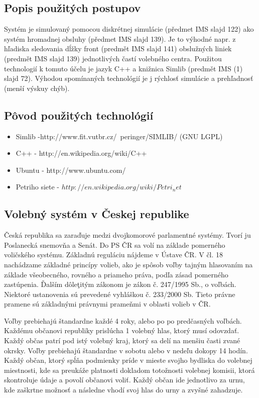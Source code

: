 \documentclass[12pt,a4paper,titlepage,final]{article}
\begin{document}
\subsection{Popis použitých postupov}
Systém je simulovaný pomocou diskrétnej simulácie (předmet IMS slajd 122) ako systém hromadnej obsluhy 
(předmet IMS slajd 139). Je to výhodné napr. z hľadiska sledovania dĺžky front (predmět IMS slajd 141) 
obslužných liniek (predmět IMS slajd 139) jednotlivých častí volebného centra. Použitou 
technologií k tomuto účelu je jazyk C++ a knižnica Simlib (predmět IMS (1) slajd 72). Výhodou spomínaných 
technológií je j rýchlosť simulácie a 
prehľadnosť (menší výskuy chýb).



\subsection{Pôvod použitých technológií}
\begin{itemize}
\item Simlib -http://www.fit.vutbr.cz/~peringer/SIMLIB/ (GNU LGPL)
\item C++ - http://en.wikipedia.org/wiki/C++
\item Ubuntu - http://www.ubuntu.com/
\item Petriho siete - $http://en.wikipedia.org/wiki/Petri_net$

\end{itemize}



\subsection{Volebný systém v Českej republike}
Česká republika sa zaraďuje medzi dvojkomorové parlamentné 
systémy. Tvorí ju Poslanecká snemovňa a Senát. Do PS ČR sa volí na 
základe pomerného voličského systému. Základnú reguláciu nájdeme 
v Ústave ČR. V čl. 18 nachádzame základné princípy volieb, ako je spôsob 
voľby tajným hlasovaním na základe všeobecného, rovného a priameho 
práva, podľa zásad pomerného zastúpenia. Ďalším dôleţitým zákonom je 
zákon č. 247/1995 Sb., o voľbách. Niektoré ustanovenia sú prevedené 
vyhláškou č. 233/2000 Sb. Tieto právne pramene sú základnými právnymi 
prameňmi v oblasti volieb v ČR.\cite{Seda:Voleb}

Voľby prebiehajú štandardne každé 4 roky, alebo po po predčasných voľbách. Každému občanovi republiky prislúcha 1 volebný hlas, ktorý musí odovzdať. Každý občas patrí pod istý volebný kraj, ktorý sa delí na menšiu časti zvané okrsky. Voľby prebiehajú štandardne v sobotu alebo v nedeľu dokopy 14 hodín. Každý občan, ktorý spĺňa podmienky príde v mieste svojho bydliska do volebnej miestnosti, kde sa preukáže platnosti dokladom totožnosti volebnej komisii, ktorá skontroluje údaje a povolí občanovi voliť. Každý občan ide jednotlivo za urnu, kde zaškrtne možnosť a následne vhodí svoj hlas do urny a zvyšné zahadzuje.
\end{document}
